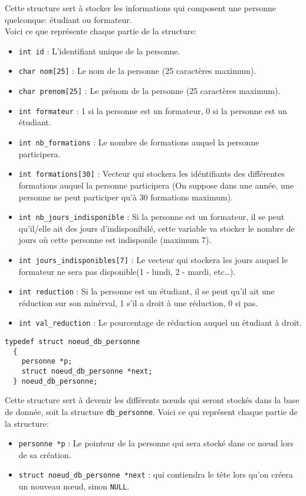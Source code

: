 \documentclass[11pt]{article}
\begin{document}
Cette structure sert à stocker les informations qui composent une personne quelconque: étudiant ou formateur.\\
Voici ce que représente chaque partie de la structure:
\begin{itemize}
\item \texttt{int id} : L'identifiant unique de la personne.
\item \texttt{char nom[25]} : Le nom de la personne (25 caractères maximum).
\item \texttt{char prenom[25]} : Le prénom de la personne (25 caractères maximum).
\item \texttt{int formateur} : 1 si la personne est un formateur, 0 si la personne est un étudiant.
\item \texttt{int nb\_formations} : Le nombre de formations auquel la personne participera.
\item \texttt{int formations[30]} : Vecteur qui stockera les idéntifiants des différentes formations auquel la personne participera (On suppose dans une année, une personne ne peut participer qu'à 30 formations maximum).
\item \texttt{int nb\_jours\_indisponible} : Si la personne est un formateur, il se peut qu'il/elle ait des jours d'indisponibilé, cette variable va stocker le nombre de jours où cette personne est indisponile (maximum 7).
\item \texttt{int jours\_indisponibles[7]} : Le vecteur qui stockera les jours auquel le formateur ne sera pas disponible(1 - lundi, 2 - mardi, etc\ldots).
\item \texttt{int reduction} : Si la personne est un étudiant, il se peut qu'il ait une réduction sur son minérval, 1 s'il a droit à une réduction, 0 si pas.
\item \texttt{int val\_reduction} : Le pourcentage de réduction auquel un étudiant à droit.
\end{itemize}

\begin{lstlisting}[firstnumber=51]
  typedef struct noeud_db_personne
  {
    personne *p;
    struct noeud_db_personne *next;
  } noeud_db_personne;
\end{lstlisting}

Cette structure sert à devenir les différents n\oe{}uds qui seront stockés dans la base de donnée, soit la structure \texttt{db\_personne}.
Voici ce qui représent chaque partie de la structure:
\begin{itemize}
\item \texttt{personne *p} : Le pointeur de la personne qui sera stocké dans ce n\oe{}ud lors de sa création.
\item \texttt{struct noeud\_db\_personne *next} : qui contiendra le tête lors qu'on créera un nouveau n\oe{}ud, sinon \texttt{NULL}.
\end{itemize}
\end{document}
